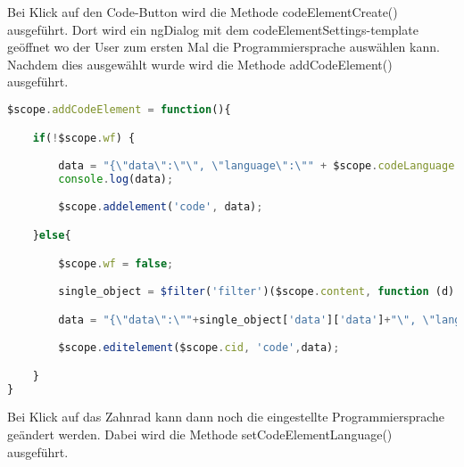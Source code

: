 
Bei Klick auf den Code-Button wird die Methode codeElementCreate() ausgeführt. Dort wird ein ngDialog mit dem codeElementSettings-template geöffnet wo der User zum ersten Mal die Programmiersprache auswählen kann. Nachdem dies ausgewählt wurde wird die Methode addCodeElement() ausgeführt.

\begin{lstlisting}[caption={Code-Element Persistierung}, language=Javascript]
$scope.addCodeElement = function(){

    if(!$scope.wf) {

        data = "{\"data\":\"\", \"language\":\"" + $scope.codeLanguage + "\"}";
        console.log(data);

        $scope.addelement('code', data);

    }else{

        $scope.wf = false;

        single_object = $filter('filter')($scope.content, function (d) {return d.id === $scope.cid;})[0];

        data = "{\"data\":\""+single_object['data']['data']+"\", \"language\":\"" + $scope.codeLanguage + "\"}";

        $scope.editelement($scope.cid, 'code',data);

    }
}
\end{lstlisting}

Bei Klick auf das Zahnrad kann dann noch die eingestellte Programmiersprache geändert werden. Dabei wird die Methode setCodeElementLanguage() ausgeführt.
